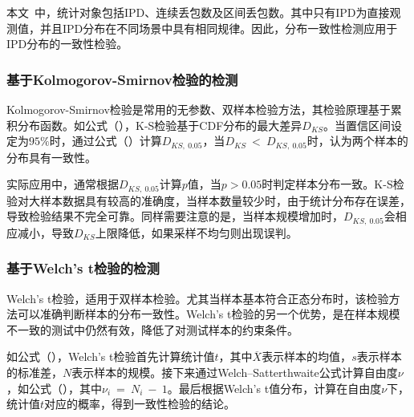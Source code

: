 本文\ 中，统计对象包括IPD、连续丢包数及区间丢包数。其中只有IPD为直接观测值，并且IPD分布在不同场景中具有相同规律。因此，分布一致性检测应用于IPD分布的一致性检验。

\subsubsection{基于Kolmogorov-Smirnov检验的检测}
\label{chap:analyze:statistical:test:ks}

Kolmogorov-Smirnov检验是常用的无参数、双样本检验方法，其检验原理基于累积分布函数。如公式（），K-S检验基于CDF分布的最大差异$D_{KS}$。当置信区间设定为$95\%$时，通过公式（）计算$D_{KS,\ 0.05}$，当$D_{KS}\ <\ D_{KS,\ 0.05}$时，认为两个样本的分布具有一致性。

实际应用中，通常根据$D_{KS,\ 0.05}$计算$p$值，当$p> 0.05$时判定样本分布一致。K-S检验对大样本数据具有较高的准确度，当样本数量较少时，由于统计分布存在误差，导致检验结果不完全可靠。同样需要注意的是，当样本规模增加时，$D_{KS,\ 0.05}$会相应减小，导致$D_{KS}$上限降低，如果采样不均匀则出现误判。

\subsubsection{基于Welch's t检验的检测}
\label{chap:analyze:statistical:test:t}

Welch's t检验，适用于双样本检验。尤其当样本基本符合正态分布时，该检验方法可以准确判断样本的分布一致性。Welch's t检验的另一个优势，是在样本规模不一致的测试中仍然有效，降低了对测试样本的约束条件。

如公式（），Welch's t检验首先计算统计值$t$，其中$\overline{X}$表示样本的均值，$s$表示样本的标准差，$N$表示样本的规模。接下来通过Welch–Satterthwaite公式计算自由度$\nu$，如公式（），其中$\nu_{i}\ =\ N_{i}\ -\ 1$。最后根据Welch's t值分布，计算在自由度$\nu$下，统计值$t$对应的概率，得到一致性检验的结论。

